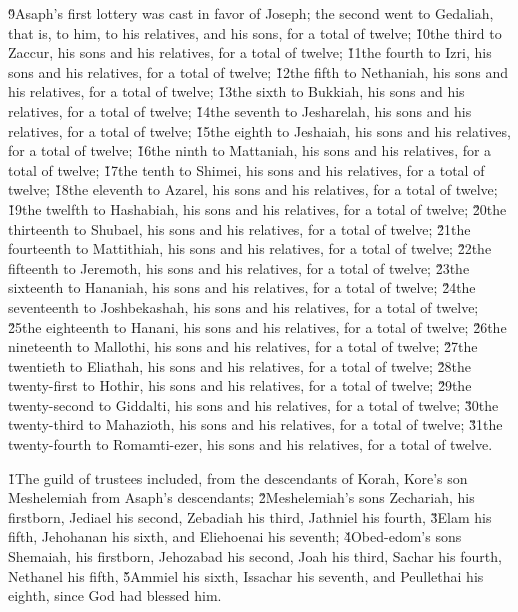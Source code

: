 \v{9}Asaph's first lottery was cast in favor of Joseph; the second went to Gedaliah, that is, to him, to his relatives, and his sons, for a total of twelve; \v{10}the third to Zaccur, his sons and his relatives, for a total of twelve; \v{11}the fourth to Izri, his sons and his relatives, for a total of twelve; \v{12}the fifth to Nethaniah, his sons and his relatives, for a total of twelve; \v{13}the sixth to Bukkiah, his sons and his relatives, for a total of twelve; \v{14}the seventh to Jesharelah, his sons and his relatives, for a total of twelve; \v{15}the eighth to Jeshaiah, his sons and his relatives, for a total of twelve; \v{16}the ninth to Mattaniah, his sons and his relatives, for a total of twelve; \v{17}the tenth to Shimei, his sons and his relatives, for a total of twelve; \v{18}the eleventh to Azarel, his sons and his relatives, for a total of twelve; \v{19}the twelfth to Hashabiah, his sons and his relatives, for a total of twelve; \v{20}the thirteenth to Shubael, his sons and his relatives, for a total of twelve; \v{21}the fourteenth to Mattithiah, his sons and his relatives, for a total of twelve; \v{22}the fifteenth to Jeremoth, his sons and his relatives, for a total of twelve; \v{23}the sixteenth to Hananiah, his sons and his relatives, for a total of twelve; \v{24}the seventeenth to Joshbekashah, his sons and his relatives, for a total of twelve; \v{25}the eighteenth to Hanani, his sons and his relatives, for a total of twelve; \v{26}the nineteenth to Mallothi, his sons and his relatives, for a total of twelve; \v{27}the twentieth to Eliathah, his sons and his relatives, for a total of twelve; \v{28}the twenty-first to Hothir, his sons and his relatives, for a total of twelve; \v{29}the twenty-second to Giddalti, his sons and his relatives, for a total of twelve; \v{30}the twenty-third to Mahazioth, his sons and his relatives, for a total of twelve; \v{31}the twenty-fourth to Romamti-ezer, his sons and his relatives, for a total of twelve.

\v{1}The guild of trustees included, from the descendants of Korah, Kore's son Meshelemiah from Asaph's descendants; \v{2}Meshelemiah's sons Zechariah, his firstborn, Jediael his second, Zebadiah his third, Jathniel his fourth, \v{3}Elam his fifth, Jehohanan his sixth, and Eliehoenai his seventh; \v{4}Obed-edom's sons Shemaiah, his firstborn, Jehozabad his second, Joah his third, Sachar his fourth, Nethanel his fifth, \v{5}Ammiel his sixth, Issachar his seventh, and Peullethai his eighth, since God had blessed him.

